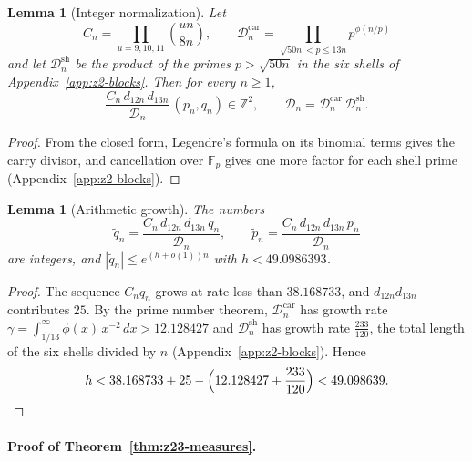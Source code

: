 \documentclass[oneside,english,11pt]{amsart}
\newtheorem{lemma}[thm]{Lemma}
\begin{document}
\begin{lemma}[Integer normalization]\label{prop:zeta2-int}
Let 
\[
C_n=\prod_{u=9,10,11}\binom{un}{8n},\qquad \mathcal D^{\mathrm{car}}_n=\prod_{\sqrt{50n}<p\le13n}p^{\phi(n/p)}
\] 
and let $\mathcal D^{\mathrm{sh}}_n$ be the product of the primes $p>\sqrt{50n}$ in the six shells of Appendix~\ref{app:z2-blocks}. Then for every $n\ge1$,
\[
  \frac{C_n\,d_{12n}\,d_{13n}}{\mathcal D_n}\,(p_n,q_n)\in\mathbb Z^2,
  \qquad \mathcal D_n=\mathcal D^{\mathrm{car}}_n\,\mathcal D^{\mathrm{sh}}_n .
\]
\end{lemma}

\begin{proof}
From the closed form, Legendre's formula on its binomial terms gives the carry divisor, and cancellation over $\mathbb F_p$ gives one more factor for each shell prime (Appendix~\ref{app:z2-blocks}).
\end{proof}

\begin{lemma}[Arithmetic growth]\label{lem:z2-growth}
The numbers
\[
  \widetilde q_n=\frac{C_n\,d_{12n}\,d_{13n}\,q_n}{\mathcal D_n},\qquad
  \widetilde p_n=\frac{C_n\,d_{12n}\,d_{13n}\,p_n}{\mathcal D_n}
\]
are integers, and $|\widetilde q_n|\le e^{(h+o(1))n}$ with $h<49.0986393$.
\end{lemma}

\begin{proof}
The sequence $C_nq_n$ grows at rate less than $38.168733$, and $d_{12n}d_{13n}$ contributes $25$.
By the prime number theorem, $\mathcal D^{\mathrm{car}}_n$ has growth rate $\gamma=\int_{1/13}^\infty\phi(x)\,x^{-2}\,dx>12.128427$ and $\mathcal D^{\mathrm{sh}}_n$ has growth rate $\frac{233}{120}$, the total length of the six shells divided by $n$ (Appendix~\ref{app:z2-blocks}). Hence
\[
  h<38.168733+25-\Bigl(12.128427+\frac{233}{120}\Bigr)<49.098639 .
\]
\end{proof}
\paragraph{Proof of Theorem~\ref{thm:z23-measures}.}
\end{document}
